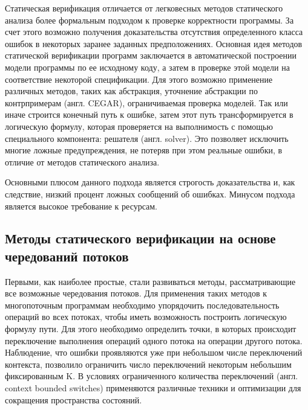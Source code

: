 Статическая верификация отличается от легковесных методов статического анализа более формальным подходом к проверке корректности программы.
За счет этого возможно получения доказательства отсутствия определенного класса ошибок в некоторых заранее заданных предположениях.
%
%
Основная идея методов статической верификации программ заключается в автоматической построении модели программы по ее исходному коду, а затем в проверке этой модели на соответствие некоторой спецификации.
Для этого возможно применение различных методов, таких как абстракция, уточнение абстракции по контрпримерам (англ. CEGAR), ограничиваемая проверка моделей.
Так или иначе строится конечный путь к ошибке, затем этот путь трансформируется в логическую формулу, которая проверяется на выполнимость с помощью специального компонента: решателя (англ. solver).
Это позволяет исключить многие ложные предупреждения, не потеряв при этом реальные ошибки, в отличие от методов статического анализа.

Основными плюсом данного подхода является строгость доказательства и, как следствие, низкий процент ложных сообщений об ошибках.
Минусом подхода является высокое требование к ресурсам.

\subsection{Методы статического верификации на основе чередований потоков}

Первыми, как наиболее простые, стали развиваться методы, рассматривающие все возможные чередования потоков.
Для применения таких методов к многопоточным программам необходимо упорядочить последовательность операций во всех потоках, чтобы иметь возможность построить логическую формулу пути.
Для этого необходимо определить точки, в которых происходит переключение выполнения операций одного потока на операции другого потока.
Наблюдение, что ошибки проявляются уже при небольшом числе переключений контекста, позволило ограничить число переключений некоторым небольшим фиксированным K.
В условиях ограниченного количества переключений (англ. context bounded switches) применяются различные техники и оптимизации для сокращения пространства состояний. 

